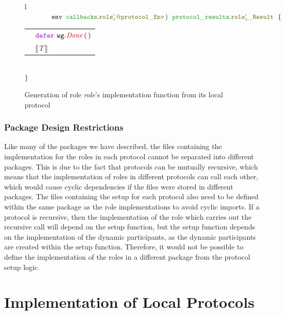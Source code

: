 \documentclass[12pt,twoside]{report}
\begin{document}
\begin{figure}[!h]
\begin{center}
\begin{tabular}{l}
            $\qquad \qquad \envparam\;\ \envtype{role'_i}{protocol}\,)\ \ \resulttype{role'_i}{protocol}\ \ \{$\\[6pt]
            
            \begin{tabular}{ll}
                \indent & $\godefer\ \methodcall{wg}{Done}\,(\,)$\\[3.5pt]
                \indent & $\llbracket \, T \, \rrbracket$
            \end{tabular}\\[6pt]

            $\}$\\

        \end{tabular}
    \end{center}
    \caption{Generation of role \textit{role}'s implementation function from its local protocol}
    \label{role-func-sig-gen}
\end{figure}

\subsection{Package Design Restrictions}

Like many of the packages we have described, the files containing the implementation for the roles in each protocol cannot be separated into different packages. This is due to the fact that protocols can be mutually recursive, which means that the implementation of roles in different protocols can call each other, which would cause cyclic dependencies if the files were stored in different packages. The files containing the setup for each protocol also need to be defined within the same package as the role implementations to avoid cyclic imports. If a protocol is recursive, then the implementation of the role which carries out the recursive call will depend on the setup function, but the setup function depends on the implementation of the dynamic participants, as the dynamic participants are created within the setup function. Therefore, it would not be possible to define the implementation of the roles in a different package from the protocol setup logic.\\


\chapter{Implementation of Local Protocols}\label{local-protocol-codegen}
\end{document}
